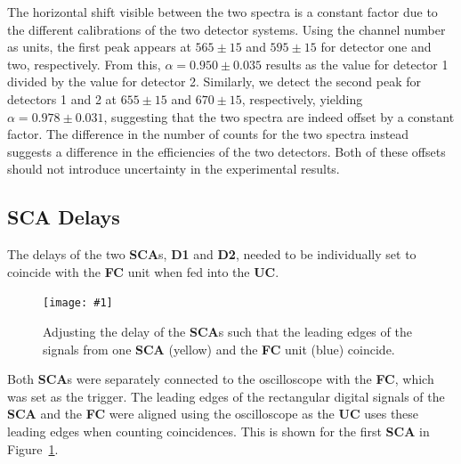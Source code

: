 \documentclass[twocolumn]{article}
\newcommand{\insertFigure}[1]{%
   \texttt{[image: \#1]}%
}
\begin{document}
\par The horizontal shift visible between the two spectra is a constant factor due to the different calibrations of the two detector systems. Using the channel number as units, the first peak appears at $565 \pm 15$ and $595 \pm 15$ for detector one and two, respectively. From this, $\alpha = 0.950 \pm 0.035$ results as the value for detector 1 divided by the value for detector 2. Similarly, we detect the second peak for detectors 1 and 2 at $655 \pm 15$ and $670 \pm 15$, respectively, yielding $\alpha = 0.978 \pm 0.031$, suggesting that the two spectra are indeed offset by a constant factor. The difference in the number of counts for the two spectra instead suggests a difference in the efficiencies of the two detectors. Both of these offsets should not introduce uncertainty in the experimental results.

\subsection{SCA Delays}
The delays of the two \textbf{SCA}s, \textbf{D1} and \textbf{D2}, needed to be individually set to coincide with the \textbf{FC} unit when fed into the \textbf{UC}. 
\begin{figure} [!h]
	\centering
	\insertFigure{./screenshots/SC07_cropped.png}
	\caption{Adjusting the delay of the \textbf{SCA}s such that the leading edges of the signals from one \textbf{SCA} (yellow) and the \textbf{FC} unit (blue) coincide.}
	\label{fig:sca-overlap}
\end{figure}
Both \textbf{SCA}s were separately connected to the oscilloscope with the \textbf{FC}, which was set as the trigger. The leading edges of the rectangular digital signals of the \textbf{SCA} and the \textbf{FC} were aligned using the oscilloscope as the \textbf{UC} uses these leading edges when counting coincidences. This is shown for the first \textbf{SCA} in Figure~\ref{fig:sca-overlap}.
\end{document}
